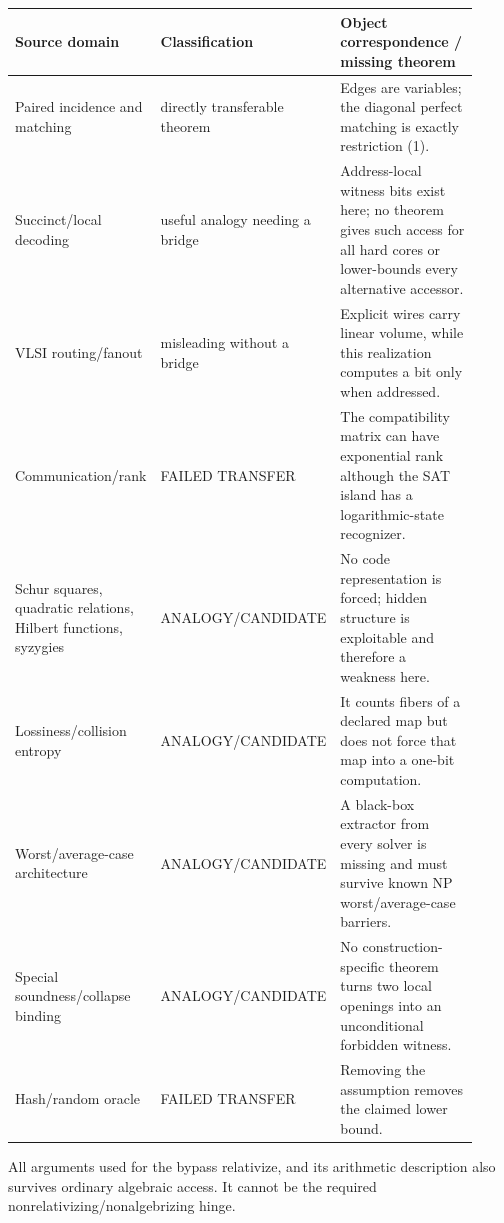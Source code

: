 \documentclass[11pt]{article}
\begin{document}
\begin{center}\small
\begin{tabular}{p{0.31\linewidth}p{0.24\linewidth}p{0.37\linewidth}}
\toprule
Source domain & Classification & Object correspondence / missing theorem\\
\midrule
Paired incidence and matching & directly transferable theorem &
Edges are variables; the diagonal perfect matching is exactly restriction
(1).\\
Succinct/local decoding & useful analogy needing a bridge &
Address-local witness bits exist here; no theorem gives such access for all
hard cores or lower-bounds every alternative accessor.\\
VLSI routing/fanout & misleading without a bridge &
Explicit wires carry linear volume, while this realization computes a bit
only when addressed.\\
Communication/rank & FAILED TRANSFER &
The compatibility matrix can have exponential rank although the SAT island
has a logarithmic-state recognizer.\\
Schur squares, quadratic relations, Hilbert functions, syzygies &
ANALOGY/CANDIDATE & No code representation is forced; hidden structure is
exploitable and therefore a weakness here.\\
Lossiness/collision entropy & ANALOGY/CANDIDATE &
It counts fibers of a declared map but does not force that map into a
one-bit computation.\\
Worst/average-case architecture & ANALOGY/CANDIDATE &
A black-box extractor from every solver is missing and must survive known NP
worst/average-case barriers.\\
Special soundness/collapse binding & ANALOGY/CANDIDATE &
No construction-specific theorem turns two local openings into an
unconditional forbidden witness.\\
Hash/random oracle & FAILED TRANSFER & Removing the assumption removes the
claimed lower bound.\\
\bottomrule
\end{tabular}
\end{center}
All arguments used for the bypass relativize, and its arithmetic description
also survives ordinary algebraic access.  It cannot be the required
nonrelativizing/nonalgebrizing hinge.
\end{document}
